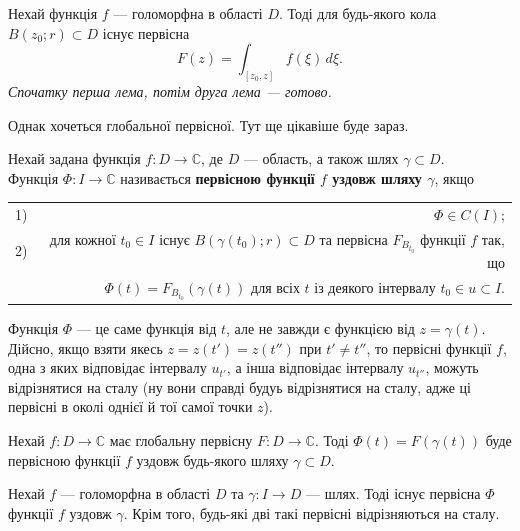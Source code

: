 \documentclass{math_library}
\begin{document}
\begin{theorem}
\label{local_antiderivative_existence}
Нехай функція $f$ --- голоморфна в області $D$. Тоді для будь-якого кола $B(z_0;r) \subset D$ існує первісна 
\[
F(z) = \displaystyle\int_{[z_0,z]} f(\xi)\,d\xi.
\]
\textit{Спочатку перша лема, потім друга лема --- готово.}
\end{theorem}

Однак хочеться глобальної первісної. Тут ще цікавіше буде зараз.

\begin{definition}
Нехай задана функція $f \colon D \to \mathbb{C}$, де $D$ --- область, а також шлях $\gamma \subset D$.\\
Функція $\Phi \colon I \to \mathbb{C}$ називається \textbf{первісною функції $f$ уздовж шляху $\gamma$}, якщо
\begin{center}
\begin{tabular}{lr}
1) & $\Phi \in C(I)$; \\
2) & для кожної $t_0 \in I$ існує $B(\gamma(t_0);r) \subset D$ та первісна $F_{B_{t_0}}$ функції $f$ так, що \\
 & $\Phi(t) = F_{B_{t_0}}(\gamma(t))$ для всіх $t$ із деякого інтервалу $t_0 \in u \subset I$.
\end{tabular}
\end{center}   
\end{definition}

\begin{remark}
Функція $\Phi$ --- це саме функція від $t$, але не завжди є функцією від $z = \gamma(t)$.\\
Дійсно, якщо взяти якесь $z = z(t') = z(t'')$ при $t' \neq t''$, то первісні функції $f$, одна з яких відповідає інтервалу $u_{t'}$, а інша відповідає інтервалу $u_{t''}$, можуть відрізнятися на сталу (ну вони справді будуь відрізнятися на сталу, адже ці первісні в околі однієї й тої самої точки $z$).
\end{remark}

\begin{remark}
Нехай $f \colon D \to \mathbb{C}$ має глобальну первісну $F \colon D \to \mathbb{C}$. Тоді $\Phi(t) = F(\gamma(t))$ буде первісною функції $f$ уздовж будь-якого шляху $\gamma \subset D$.  
\end{remark}

\begin{theorem}
Нехай $f$ --- голоморфна в області $D$ та $\gamma \colon I \to D$ --- шлях. Тоді існує первісна $\Phi$ функції $f$ уздовж $\gamma$. Крім того, будь-які дві такі первісні відрізняються на сталу. 
\end{theorem}
\end{document}
